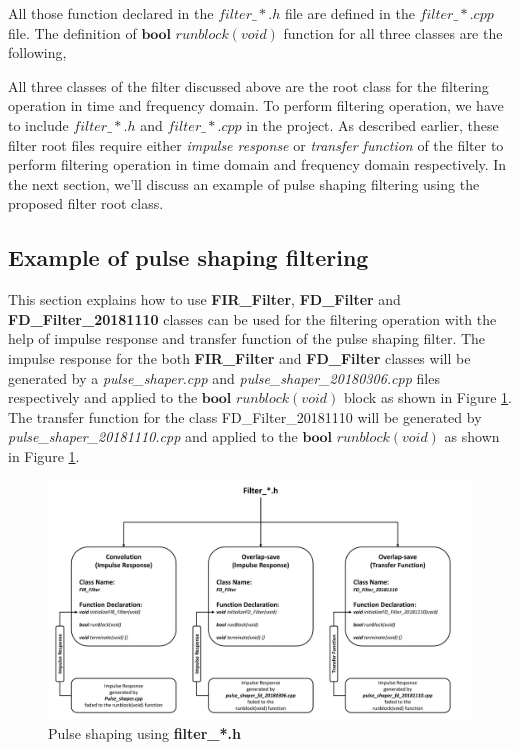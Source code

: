 \begin{refsection}
All those function declared in the $filter\_*.h$ file are defined in the $filter\_*.cpp$ file. The definition of $\textbf{bool}$ $runblock(void)$ function for all three classes are the following,



All three classes of the filter discussed above are the root class for the filtering operation in time and frequency domain. To perform filtering operation, we have to include  $filter\_*.h$ and $filter\_*.cpp$ in the project. As described earlier, these filter root files require either \textit{impulse response} or \textit{transfer function} of the filter to perform filtering operation in time domain and frequency domain respectively. In the next section, we'll discuss an example of pulse shaping filtering using the proposed filter root class.

\subsection*{Example of pulse shaping filtering}
This section explains how to use \textbf{FIR\_Filter}, \textbf{FD\_Filter} and \textbf{FD\_Filter\_20181110} classes can be used for the filtering operation with the help of impulse response and transfer function of the pulse shaping filter. 
The impulse response for the both \textbf{FIR\_Filter} and \textbf{FD\_Filter} classes will be generated by a \textit{pulse\_shaper.cpp} and \textit{pulse\_shaper\_20180306.cpp} files respectively and applied to the $\textbf{bool}$ $runblock(void)$ block as shown in Figure \ref{Pulse_shaping}. The transfer function for the class {FD\_Filter\_20181110} will be generated by  \textit{pulse\_shaper\_20181110.cpp} and applied to the $\textbf{bool}$ $runblock(void)$ as shown in  Figure \ref{Pulse_shaping}.
\begin{figure}[h]
	\centering
	\includegraphics[width=17cm]{./algorithms/filter/figures/Pulse_shaping.pdf}
	\caption{Pulse shaping using \textbf{filter\_*.h}}
	\label{Pulse_shaping}
\end{figure}

\end{refsection}
